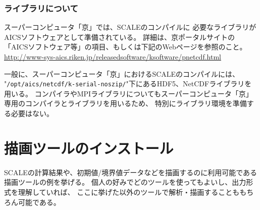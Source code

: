\subsubsection{ライブラリについて}
スーパーコンピュータ「京」では、SCALEのコンパイルに
必要なライブラリがAICSソフトウェアとして準備されている。
詳細は、京ポータルサイトの「AICSソフトウェア等」の項目、もしくは下記のWebページを参照のこと。\\
\noindent \url{http://www-sys-aics.riken.jp/releasedsoftware/ksoftware/pnetcdf.html}

一般に、スーパーコンピュータ「京」におけるSCALEのコンパイルには、\\
\noindent "\verb|/opt/aics/netcdf/k-serial-noszip/|"下にあるHDF5、NetCDFライブラリを用いる。
コンパイラやMPIライブラリについてもスーパーコンピュータ「京」専用のコンパイラとライブラリを用いるため、
特別にライブラリ環境を準備する必要はない。



\section{描画ツールのインストール} \label{chap:install_drawtool}
\label{sec:env_vis_tools}

SCALEの計算結果や、初期値/境界値データなどを描画するのに利用可能である描画ツールの例を挙げる。
個人の好みでどのツールを使ってもよいし、出力形式を理解していれば、
ここに挙げた以外のツールで解析・描画することももちろん可能である。

